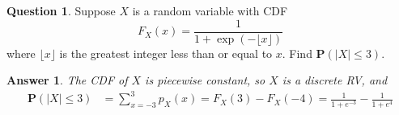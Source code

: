 \documentclass[utf8]{article}
\theoremstyle{definition}%
\newtheorem{question}{Question} %
\theoremstyle{plain}%
\newtheorem{answer}{Answer} %
\begin{document}
\begin{question}
    Suppose $X$ is a random variable with CDF
    \begin{equation}
        F_{X}(x) = \frac{1}{1 + \exp(-\lfloor x \rfloor)}
    \end{equation}
    where $\lfloor x \rfloor$ is the greatest integer less than or equal to $x$. Find $\mathbf{P}(|X| \leq 3)$.
\end{question}
\begin{answer}
    The CDF of $X$ is piecewise constant, so $X$ is a discrete RV, and 
    \begin{equation}
    \begin{aligned}
        \mathbf{P}(|X| \leq 3) &= \sum_{x=-3}^{3}p_{X}(x) = F_{X}(3) - F_{X}(-4) = \frac{1}{1 + e^{-3}} - \frac{1}{1 + e^{4}}
    \end{aligned}
    \end{equation}
\end{answer}
\end{document}
